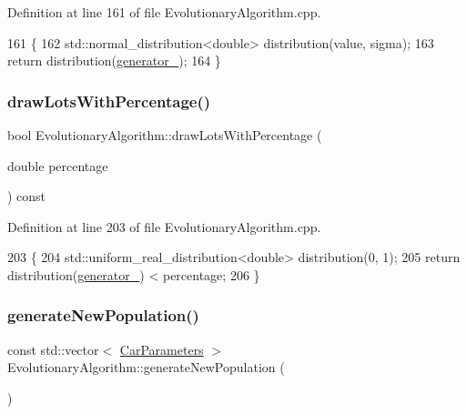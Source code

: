 Definition at line 161 of file Evolutionary\+Algorithm.\+cpp.


\begin{DoxyCode}
161                                                                        \{
162     std::normal\_distribution<double> distribution(value, sigma);
163     \textcolor{keywordflow}{return} distribution(\hyperlink{classEvolutionaryAlgorithm_adbd823d385ad95bf20496fd2fc25ccde}{generator\_});
164 \}
\end{DoxyCode}
\mbox{\label{classEvolutionaryAlgorithm_a20aec1049a8837cddef2305259450fe3}} 
\subsubsection{\texorpdfstring{draw\+Lots\+With\+Percentage()}{drawLotsWithPercentage()}}
{\footnotesize\ttfamily bool Evolutionary\+Algorithm\+::draw\+Lots\+With\+Percentage (\begin{DoxyParamCaption}\item[{double}]{percentage }\end{DoxyParamCaption}) const\hspace{0.3cm}{\ttfamily [private]}}



Definition at line 203 of file Evolutionary\+Algorithm.\+cpp.


\begin{DoxyCode}
203                                                                           \{
204     std::uniform\_real\_distribution<double> distribution(0, 1);
205     \textcolor{keywordflow}{return} distribution(\hyperlink{classEvolutionaryAlgorithm_adbd823d385ad95bf20496fd2fc25ccde}{generator\_}) < percentage;
206 \}
\end{DoxyCode}
\mbox{\label{classEvolutionaryAlgorithm_aad3e66c5d020fdcf1cb1e5ade0f01385}} 
\subsubsection{\texorpdfstring{generate\+New\+Population()}{generateNewPopulation()}}
{\footnotesize\ttfamily const std\+::vector$<$ \hyperlink{classCarParameters}{Car\+Parameters} $>$ Evolutionary\+Algorithm\+::generate\+New\+Population (\begin{DoxyParamCaption}{ }\end{DoxyParamCaption})}



